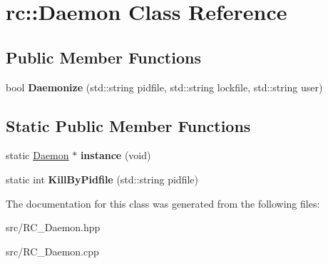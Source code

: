 \hypertarget{classrc_1_1Daemon}{\section{rc\+:\+:Daemon Class Reference}
\label{classrc_1_1Daemon}
}
\subsection*{Public Member Functions}
\begin{DoxyCompactItemize}
\item 
\hypertarget{classrc_1_1Daemon_a53ac269d47da15e64060e95c9d940326}{bool {\bfseries Daemonize} (std\+::string pidfile, std\+::string lockfile, std\+::string user)}\label{classrc_1_1Daemon_a53ac269d47da15e64060e95c9d940326}

\end{DoxyCompactItemize}
\subsection*{Static Public Member Functions}
\begin{DoxyCompactItemize}
\item 
\hypertarget{classrc_1_1Daemon_aa2428f2ddc48f857a3322da05d3c4b61}{static \hyperlink{classrc_1_1Daemon}{Daemon} $\ast$ {\bfseries instance} (void)}\label{classrc_1_1Daemon_aa2428f2ddc48f857a3322da05d3c4b61}

\item 
\hypertarget{classrc_1_1Daemon_af2fc0295df3f758b4522198e01df1f24}{static int {\bfseries Kill\+By\+Pidfile} (std\+::string pidfile)}\label{classrc_1_1Daemon_af2fc0295df3f758b4522198e01df1f24}

\end{DoxyCompactItemize}


The documentation for this class was generated from the following files\+:\begin{DoxyCompactItemize}
\item 
src/R\+C\+\_\+\+Daemon.\+hpp\item 
src/R\+C\+\_\+\+Daemon.\+cpp\end{DoxyCompactItemize}
